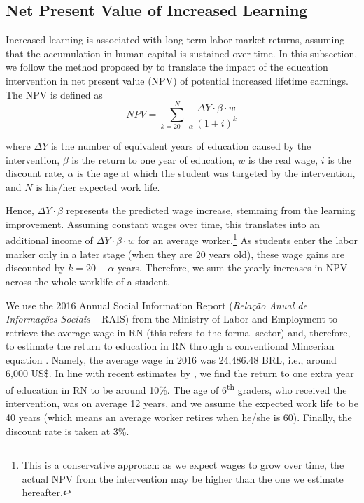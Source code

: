 \documentclass[11pt,a4paper]{article}
\begin{document}
	\clearpage
	
	\subsection{Net Present Value of Increased Learning} \label{sec:NPV}
	
	Increased learning is associated with long-term labor market returns, assuming that the accumulation in human capital is sustained over time. In this subsection, we follow the method proposed by \citet{evans2019equivalent} to translate the impact of the education intervention in net present value (NPV) of potential increased lifetime earnings. The NPV is defined as
	\begin{equation}
	NPV = \sum_{k=20-\alpha}^{N} \frac{\Delta Y \cdot \beta \cdot w}{(1+i)^k}
	\end{equation}
	
	where $\Delta Y$ is the number of equivalent years of education caused by the intervention, $\beta$ is the return to one year of education, $w$ is the real wage, $i$ is the discount rate, $\alpha$ is the age at which the student was targeted by the intervention, and $N$ is his/her expected work life.
	
	Hence, $\Delta Y \cdot \beta$ represents the predicted wage increase, stemming from the learning improvement. Assuming constant wages over time, this translates into an additional income of $\Delta Y \cdot \beta \cdot w$ for an average worker.\footnote{This is a conservative approach: as we expect wages to grow over time, the actual NPV from the intervention may be higher than the one we estimate hereafter.} As students enter the labor marker only in a later stage (when they are 20 years old), these wage gains are discounted by $k=20-\alpha$ years. Therefore, we sum the yearly increases in NPV across the whole worklife of a student.
	
	We use the 2016 Annual Social Information Report (\textit{Relação Anual de Informações Sociais} -- RAIS) from the Ministry of Labor and Employment to retrieve the average wage in RN (this refers to the formal sector) and, therefore, to estimate the return to education in RN through a conventional Mincerian equation \citep{mincer1974schooling}. Namely, the average wage in 2016 was 24,486.48 BRL, i.e., around 6,000 US\$. In line with recent estimates by \citet{psacharopoulos2018returns}, we find the return to one extra year of education in RN to be around 10\%. The age of 6\textsuperscript{th} graders, who received the intervention, was on average 12 years, and we assume the expected work life to be 40 years (which means an average worker retires when he/she is 60). Finally, the discount rate is taken at 3\%.
	
\end{document}

